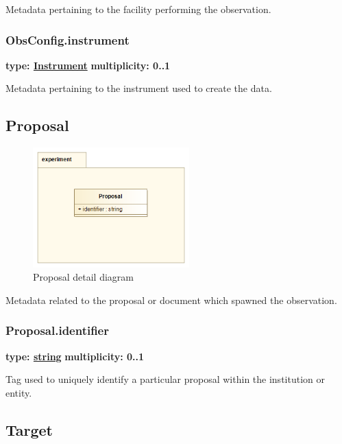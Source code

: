   Metadata pertaining to the facility performing the observation.
  
  \subsubsection{ObsConfig.instrument}
  \textbf{type: \hyperref[sect:instrument]{Instrument}} \newline
  \textbf{multiplicity: 0..1} \newline

  Metadata pertaining to the instrument used to create the data.

\pagebreak
\subsection{Proposal}
\label{sect:proposal}

  \begin{figure}[h]
  \begin{center}
    \includegraphics[width=2.375in]{diagrams/Proposal.png}
    \caption{ Proposal detail diagram}\label{fig:proposal}
  \end{center}
  \end{figure}
  
  Metadata related to the proposal or document which spawned the observation.

  \subsubsection{Proposal.identifier}
  \textbf{type: \hyperref[sect:ivoa]{string}} \newline
  \textbf{multiplicity: 0..1} \newline

  Tag used to uniquely identify a particular proposal within the institution or entity.
  
\pagebreak
\subsection{Target}
\label{sect:target}

